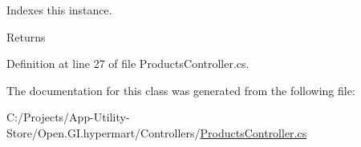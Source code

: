 Indexes this instance. 

\begin{DoxyReturn}{Returns}

\end{DoxyReturn}


Definition at line 27 of file Products\+Controller.\+cs.



The documentation for this class was generated from the following file\+:\begin{DoxyCompactItemize}
\item 
C\+:/\+Projects/\+App-\/\+Utility-\/\+Store/\+Open.\+G\+I.\+hypermart/\+Controllers/\hyperlink{_products_controller_8cs}{Products\+Controller.\+cs}\end{DoxyCompactItemize}

